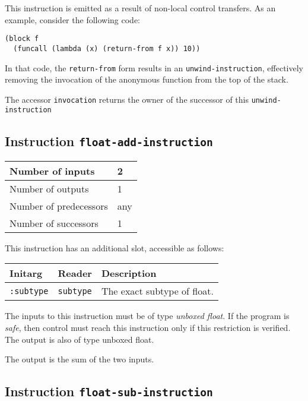 This instruction is emitted as a result of non-local control
transfers.  As an example, consider the following code:

\begin{verbatim}
(block f
  (funcall (lambda (x) (return-from f x)) 10))
\end{verbatim}

In that code, the \texttt{return-from} form results in an
\texttt{unwind-instruction}, effectively removing the invocation of
the anonymous function from the top of the stack.

The accessor \texttt{invocation} returns the owner of the successor of
this \texttt{unwind-instruction}

\subsection{Instruction \texttt{float-add-instruction}}
\label{hir-instruction-float-add}

\begin{tabular}{|l|l|}
\hline
Number of inputs & 2\\
\hline
Number of outputs & 1\\
\hline
Number of predecessors & any\\
\hline
Number of successors & 1\\
\hline
\end{tabular}

This instruction has an additional slot, accessible as follows:

\begin{tabular}{|l|l|l|}
  \hline
  Initarg & Reader & Description\\
  \hline\hline
  \texttt{:subtype} & \texttt{subtype} & The exact subtype of float.\\
  \hline
\end{tabular}

The inputs to this instruction must be of type \emph{unboxed
  float}.  If the program is \emph{safe}, then control must reach this
instruction only if this restriction is verified.  The output is also
of type unboxed float.

The output is the sum of the two inputs.

\subsection{Instruction \texttt{float-sub-instruction}}
\label{hir-instruction-float-sub}

